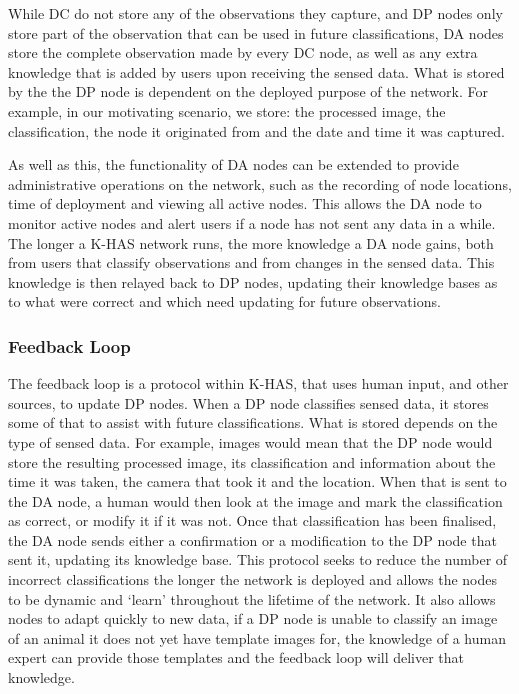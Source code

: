 	While DC do not store any of the observations they capture, and DP nodes only store part of the observation that can be used in future classifications, DA nodes store the complete observation made by every DC node, as well as any extra knowledge that is added by users upon receiving the sensed data. What is stored by the the DP node is dependent on the deployed purpose of the network. For example, in our motivating scenario, we store: the processed image, the classification, the node it originated from and the date and time it was captured.

	As well as this, the functionality of DA nodes can be extended to provide administrative operations on the network, such as the recording of node locations, time of deployment and viewing all active nodes. This allows the DA node to monitor active nodes and alert users if a node has not sent any data in a while. The longer a K-HAS network runs, the more knowledge a DA node gains, both from users that classify observations and from changes in the sensed data. This knowledge is then relayed back to DP nodes, updating their knowledge bases as to what \DIFdelbegin {}\DIFdelend \DIFaddbegin {}\DIFaddend were correct and which need updating for future observations.

	\subsubsection{Feedback Loop}
	The feedback loop is a protocol within K-HAS, that uses human input, and other sources, to update DP nodes. When a DP node classifies sensed data, it stores some of that to assist with future classifications. What is stored depends on the type of sensed data. For example, images would mean that the DP node would store the resulting processed image, its classification and information about the time it was taken, the camera that took it and the location. When that is sent to the DA node, a human would then look at the image and mark the classification as correct, or modify it if it was not. Once that classification has been finalised, the DA node sends either a confirmation or a modification to the DP node that sent it, updating its knowledge base. This protocol seeks to reduce the number of incorrect classifications the longer the network is deployed and allows the nodes to be dynamic and `learn' throughout the lifetime of the network. It also allows nodes to adapt quickly to new data, if a DP node is unable to classify an image of an animal it does not yet have template images for, the knowledge of a human expert can provide those templates and the feedback loop will deliver that knowledge.

